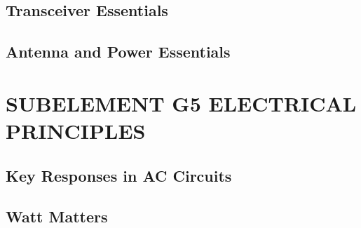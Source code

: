 \documentclass[12pt]{book}
\begin{document}
\section{Transceiver Essentials}











\section{Antenna and Power Essentials}











\chapter{SUBELEMENT G5  ELECTRICAL PRINCIPLES}
\section{Key Responses in AC Circuits}












\section{Watt Matters}














\end{document}

